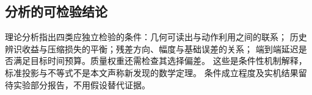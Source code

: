 \subsection{分析的可检验结论}

理论分析指出四类应独立检验的条件：几何可读出与动作利用之间的联系；
历史辨识收益与压缩损失的平衡；残差方向、幅度与基础误差的关系；
端到端延迟是否满足目标时间预算。质量权重还需检查其选择偏差。
这些是条件性机制解释，标准投影与不等式不是本文声称新发现的数学定理。
条件成立程度及实机结果留待实验部分报告，不用假设替代证据。
